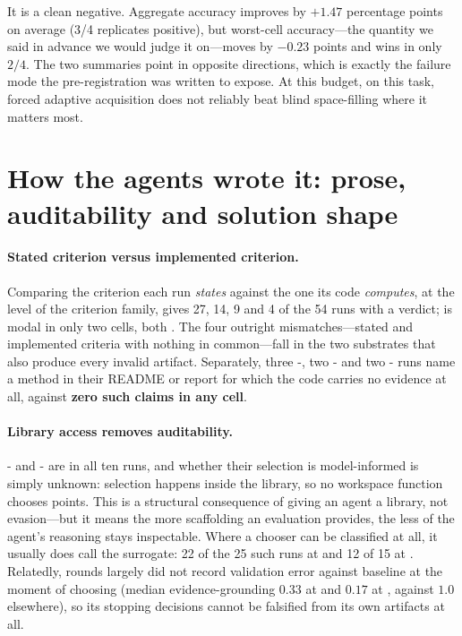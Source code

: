 It is a clean negative. Aggregate accuracy improves by $+1.47$ percentage points
on average (3/4 replicates positive), but worst-cell accuracy---the quantity we
said in advance we would judge it on---moves by $-0.23$ points and wins in only
$2/4$. The two summaries point in opposite directions, which is exactly the
failure mode the pre-registration was written to expose. At this budget, on this
task, forced adaptive acquisition does not reliably beat blind space-filling
where it matters most.

\section{How the agents wrote it: prose, auditability and solution shape}
\label{app:logicdetail}

\paragraph{Stated criterion versus implemented criterion.}
Comparing the criterion each run \emph{states} against the one its code
\emph{computes}, at the level of the criterion family, gives  27,
 14,  9 and  4 of the
54 runs with a verdict;  is modal in only two cells, both \Lthree{}.
The four outright mismatches---stated and implemented criteria with nothing in
common---fall in the two substrates that also produce every invalid artifact.
Separately, three \Ltwo{}-, two \Ltwo{}- and two \Ltwo{}-
runs name a method in their README or report for which the code carries no
evidence at all, against \textbf{zero such claims in any \Lthree{} cell}.

\paragraph{Library access removes auditability.}
\Ltwo{}- and \Ltwo{}- are  in all
ten runs, and whether their selection is model-informed is simply unknown:
selection happens inside the library, so no workspace function chooses points.
This is a structural consequence of giving an agent a library, not evasion---but
it means the more scaffolding an evaluation provides, the less of the agent's
reasoning stays inspectable. Where a chooser can be classified at all, it usually does call the surrogate:
22 of the 25 such runs at \Lthree{} and 12 of 15 at \Ltwo{}. Relatedly,  rounds largely did not record validation
error against baseline at the moment of choosing (median evidence-grounding
$0.33$ at \Ltwo{} and $0.17$ at \Lthree{}, against $1.0$ elsewhere), so its
stopping decisions cannot be falsified from its own artifacts at all.

